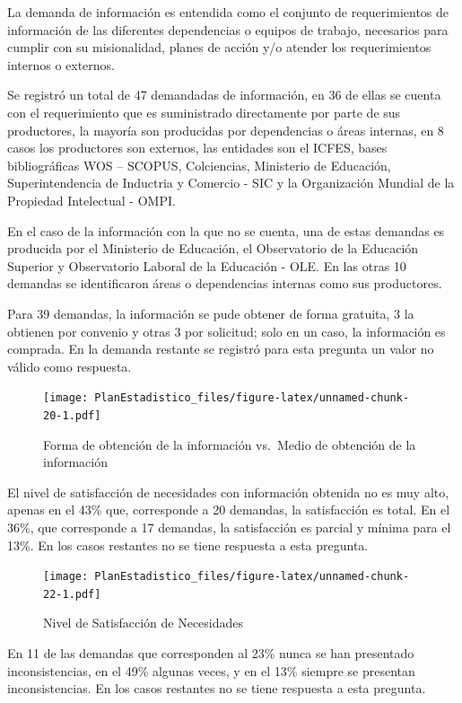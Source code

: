 \documentclass[
]{book}
\begin{document}
La demanda de información es entendida como el conjunto de requerimientos de información de
las diferentes dependencias o equipos de trabajo, necesarios para cumplir con su misionalidad,
planes de acción y/o atender los requerimientos internos o externos.

Se registró un total de 47 demandadas de información, en 36 de ellas se cuenta con el
requerimiento que es suministrado directamente por parte de sus productores, la mayoría son
producidas por dependencias o áreas internas, en 8 casos los productores son externos, las entidades son el ICFES, bases bibliográficas WOS -- SCOPUS, Colciencias, Ministerio de Educación,
Superintendencia de Inductria y Comercio - SIC y la Organización Mundial de la Propiedad Intelectual - OMPI.

En el caso de la información con la que no se cuenta, una de estas demandas es producida por el
Ministerio de Educación, el Observatorio de la Educación Superior y Observatorio Laboral de la Educación - OLE. En las otras 10 demandas
se identificaron áreas o dependencias internas como sus productores.

Para 39 demandas, la información se pude obtener de forma gratuita, 3 la obtienen por convenio y
otras 3 por solicitud; solo en un caso, la información es comprada. En la demanda restante se
registró para esta pregunta un valor no válido como respuesta.

\begin{figure}
\centering
\texttt{[image: PlanEstadistico\_files/figure-latex/unnamed-chunk-20-1.pdf]}
\caption{\label{fig:unnamed-chunk-20}Forma de obtención de la información vs.~Medio de obtención de la información}
\end{figure}

El nivel de satisfacción de necesidades con información obtenida no es muy alto, apenas en el 43\% que, corresponde a 20 demandas, la satisfacción es total. En el 36\%, que corresponde a 17 demandas, la satisfacción es parcial y mínima para el 13\%. En los casos restantes no se tiene respuesta a esta pregunta.

\begin{figure}
\centering
\texttt{[image: PlanEstadistico\_files/figure-latex/unnamed-chunk-22-1.pdf]}
\caption{\label{fig:unnamed-chunk-22}Nivel de Satisfacción de Necesidades}
\end{figure}

En 11 de las demandas que corresponden al 23\% nunca se han presentado inconsistencias, en el
49\% algunas veces, y en el 13\% siempre se presentan inconsistencias. En los casos restantes no se
tiene respuesta a esta pregunta.
\end{document}
